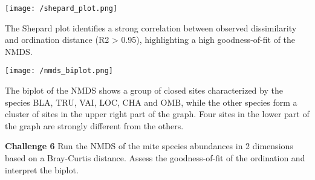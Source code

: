 \documentclass[
]{book}
\newenvironment{Shaded}{\begin{snugshade}}{\end{snugshade}}
\newcommand{\AttributeTok}[1]{\textcolor[rgb]{0.77,0.63,0.00}{#1}}
\newcommand{\CommentTok}[1]{\textcolor[rgb]{0.56,0.35,0.01}{\textit{#1}}}
\newcommand{\DecValTok}[1]{\textcolor[rgb]{0.00,0.00,0.81}{#1}}
\newcommand{\FloatTok}[1]{\textcolor[rgb]{0.00,0.00,0.81}{#1}}
\newcommand{\FunctionTok}[1]{\textcolor[rgb]{0.00,0.00,0.00}{#1}}
\newcommand{\NormalTok}[1]{#1}
\newcommand{\SpecialCharTok}[1]{\textcolor[rgb]{0.00,0.00,0.00}{#1}}
\newcommand{\StringTok}[1]{\textcolor[rgb]{0.31,0.60,0.02}{#1}}
\begin{document}
\begin{Shaded}
\end{Shaded}

\texttt{[image: /shepard\_plot.png]}

The Shepard plot identifies a strong correlation between observed
dissimilarity and ordination distance (R2 \textgreater{} 0.95), highlighting a high
goodness-of-fit of the NMDS.

\texttt{[image: /nmds\_biplot.png]}

The biplot of the NMDS shows a group of closed sites characterized by
the species BLA, TRU, VAI, LOC, CHA and OMB, while the other species
form a cluster of sites in the upper right part of the graph. Four sites
in the lower part of the graph are strongly different from the others.

\textbf{Challenge 6} Run the NMDS of the mite species abundances in 2
dimensions based on a Bray-Curtis distance. Assess the goodness-of-fit
of the ordination and interpret the biplot.
\end{document}
